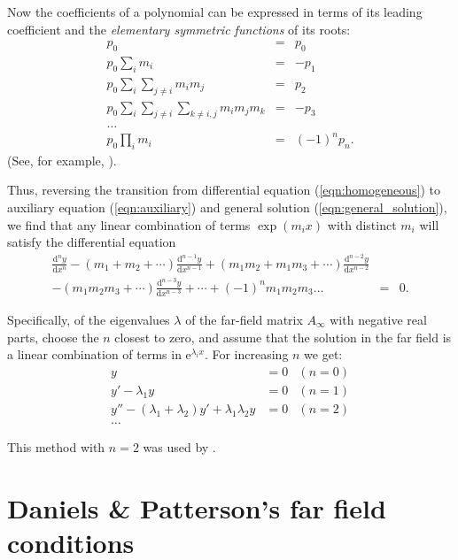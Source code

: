 \documentclass{article}
\begin{document}
Now the coefficients of a polynomial can be expressed in terms of its
leading coefficient and the \emph{elementary symmetric functions} of
its roots:
\begin{eqnarray}
p_0 & = & p_0 \\
p_0 \sum_i m_i & = & -p_1 \\
p_0 \sum_i \sum_{j\not=i} m_i m_j & = & p_2 \\
p_0 \sum_i \sum_{j\not=i} \sum_{k\not=i,j} m_i m_j m_k & = & -p_3 \\
\ldots \\
p_0 \prod_i m_i & = & (-1)^n p_n.
\end{eqnarray}
(See, for example, \citealp[ch.~5]{Turnbull52:TE}).

Thus, reversing the transition from differential equation
(\ref{eqn:homogeneous}) to auxiliary
equation (\ref{eqn:auxiliary}) and general solution
(\ref{eqn:general_solution}), we find that any linear combination of
terms $\exp(m_i x)$ with distinct $m_i$ will satisfy the differential
equation
\begin{eqnarray}
\frac{\mathrm{d}^n y}{\mathrm{d} x^n}
- (m_1+m_2+\cdots) \frac{\mathrm{d}^{n-1} y}{\mathrm{d} x^{n-1}}
+ (m_1 m_2 + m_1 m_3 + \cdots) 
        \frac{\mathrm{d}^{n-2} y}{\mathrm{d} x^{n-2}} & &  
\label{eqn:ESF_ABC} \\
- (m_1 m_2 m_3 + \cdots) 
        \frac{\mathrm{d}^{n-3} y}{\mathrm{d} x^{n-3}}
+\cdots
+ (-1)^n m_1 m_2 m_3\ldots & = & 0. \nonumber
\end{eqnarray}

Specifically, of the eigenvalues $\lambda$ of the far-field matrix
$A_\infty$ with negative real parts, choose the $n$ closest to zero,
and assume that the solution in the far field is a linear combination
of terms in $\mathrm e^{\lambda_i x}$.  For increasing $n$ we get:
\begin{align}
   y&=0 &(n=0) \\
   y' - \lambda_1 y &=0 &(n=1) \\
   y'' - (\lambda_1+\lambda_2) y' + \lambda_1 \lambda_2 y &=0 &(n=2) \\
   \ldots \nonumber
\end{align}

This method with $n=2$ was used by \citet[eq.~2.5]{Gill69:JFM-35-775}.


\section{Daniels \& Patterson's far field conditions}
\label{sec:Daniels}
\end{document}
